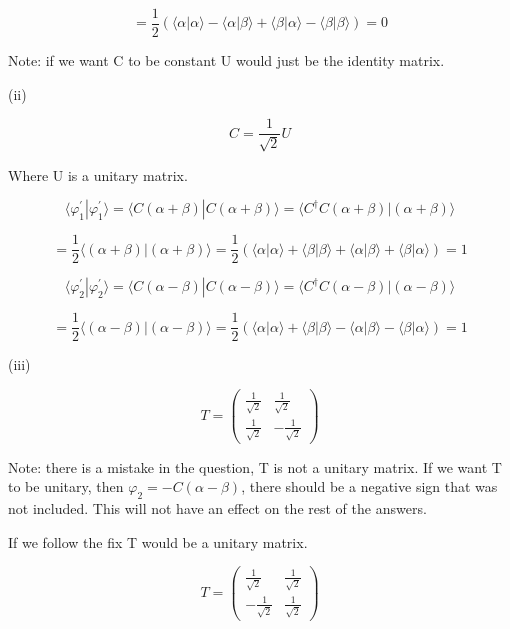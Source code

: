 \documentclass[12pt]{article}
\begin{document}
\[
    = \frac{1}{2} \left(
    \langle \alpha | \alpha \rangle
    - \langle \alpha | \beta \rangle
    + \langle \beta | \alpha \rangle
    - \langle \beta | \beta \rangle
    \right) = 0
\]

Note: if we want C to be constant U would just be the identity matrix.

(ii)

\[
    C = \frac{1}{\sqrt{2}}U
\]

Where U is a unitary matrix.

\[
    \langle \varphi_1^{\prime} | \varphi_1^{\prime} \rangle
    = \langle C(\alpha + \beta) | C(\alpha + \beta) \rangle
    = \langle C^\dagger C(\alpha + \beta) | (\alpha + \beta) \rangle
\]

\[
    = \frac{1}{2}\langle (\alpha + \beta) | (\alpha + \beta) \rangle
    = \frac{1}{2}(\langle \alpha | \alpha \rangle + \langle \beta | \beta \rangle + \langle \alpha | \beta \rangle + \langle \beta | \alpha \rangle)
    = 1
\]

\[
    \langle \varphi_2^{\prime} | \varphi_2^{\prime} \rangle
    = \langle C(\alpha - \beta) | C(\alpha - \beta) \rangle
    = \langle C^\dagger C(\alpha - \beta) | (\alpha - \beta) \rangle
\]

\[
    = \frac{1}{2}\langle (\alpha - \beta) | (\alpha - \beta) \rangle
    = \frac{1}{2}(\langle \alpha | \alpha \rangle + \langle \beta | \beta \rangle - \langle \alpha | \beta \rangle - \langle \beta | \alpha \rangle)
    = 1
\]

(iii)

\[
    T =
    \begin{pmatrix}
        \frac{1}{\sqrt{2}} & \frac{1}{\sqrt{2}}  \\
        \frac{1}{\sqrt{2}} & -\frac{1}{\sqrt{2}}
    \end{pmatrix}
\]

Note: there is a mistake in the question, T is not a unitary matrix.
If we want T to be unitary, then \(\varphi_2 = -C(\alpha - \beta)\),
there should be a negative sign that was not included.
This will not have an effect on the rest of the answers.

If we follow the fix T would be a unitary matrix.

\[
    T =
    \begin{pmatrix}
        \frac{1}{\sqrt{2}}  & \frac{1}{\sqrt{2}} \\
        -\frac{1}{\sqrt{2}} & \frac{1}{\sqrt{2}}
    \end{pmatrix}
\]
\end{document}

